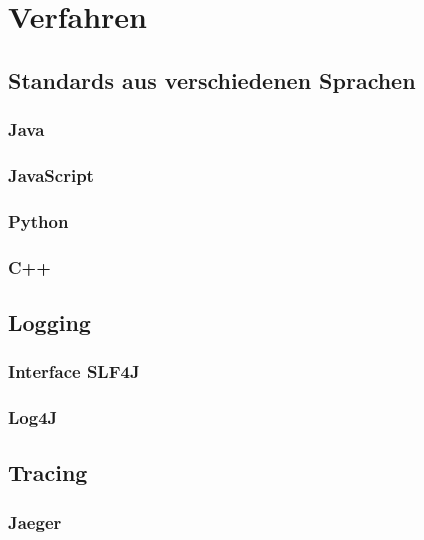 \chapter{Verfahren}\label{ch:verfahren}


\section{Standards aus verschiedenen Sprachen}\label{sec:standards-aus-verschiedenen-sprachen}

\subsection{Java}\label{subsec:java}

\subsection{JavaScript}\label{subsec:javascript}

\subsection{Python}\label{subsec:python}

\subsection{C++}\label{subsec:c++}


\section{Logging}\label{sec:logging}

\subsection{Interface SLF4J}\label{subsec:interface-slf4j}

\subsection{Log4J}\label{subsec:log4j}


\section{Tracing}\label{sec:tracing}

\subsection{Jaeger}\label{subsec:jaeger}


